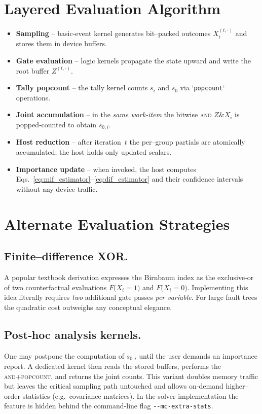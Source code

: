 \section{Layered Evaluation Algorithm}
\begin{itemize}
  \item \textbf{Sampling} – basic‐event kernel generates bit–packed outcomes
    $X_i^{(t,\cdot)}$ and stores them in device buffers.
  \item \textbf{Gate evaluation} – logic kernels propagate the state upward and
    write the root buffer $Z^{(t,\cdot)}$.
  \item \textbf{Tally popcount} – the tally kernel counts $s_i$ and $s_0$ via
    `\texttt{popcount}` operations.
  \item \textbf{Joint accumulation} – in the \emph{same work‐item} the bitwise
    \textsc{and} $Z \& X_i$ is popped‐counted to obtain $s_{0,i}$.
  \item \textbf{Host reduction} – after iteration~$t$ the per–group partials
    are atomically accumulated; the host holds only updated scalars.
  \item \textbf{Importance update} – when invoked, the host computes
    Eqs.~\eqref{eq:mif_estimator}–\eqref{eq:dif_estimator} and their confidence
    intervals without any device traffic.
\end{itemize}

\section{Alternate Evaluation Strategies}
\subsection{Finite–difference XOR.}  A popular textbook derivation expresses the
Birnbaum index as the exclusive‐or of two counterfactual evaluations
$F\bigl(X_i\!=\!1\bigr)$ and $F\bigl(X_i\!=\!0\bigr)$.  Implementing this idea
literally requires \emph{two} additional gate passes \emph{per variable}.  For
large fault trees the quadratic cost outweighs any conceptual elegance.

\subsection{Post‐hoc analysis kernels.}  One may postpone the computation of
$s_{0,i}$ until the user demands an importance report.  A dedicated kernel then
reads the stored buffers, performs the \textsc{and}+\textsc{popcount}, and
returns the joint counts.  This variant doubles memory traffic but leaves the
critical sampling path untouched and allows on‐demand higher–order statistics
(e.g.~covariance matrices).  In the solver implementation the feature is hidden
behind the command‐line flag \verb|--mc-extra-stats|.

